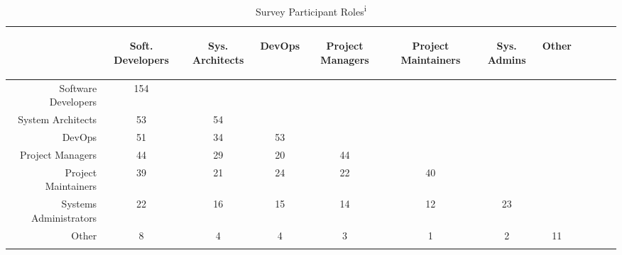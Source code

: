 \begin{table}[!htbp]
\renewcommand{\arraystretch}{1.3}
\caption{Survey Participant Roles\textsuperscript{i}}
\label{survey_roles}
\centering
\begin{tabularx}{0.45\textwidth}{@{}r|*{10}{C}c@{}}
\toprule
\addlinespace[5.4em]
	& \begin{rotate}{45} Soft. Developers \end{rotate} 
	& \begin{rotate}{45} Sys. Architects \end{rotate} 
	& \begin{rotate}{45} DevOps \end{rotate} 
	& \begin{rotate}{45} Project Managers \end{rotate}
	& \begin{rotate}{45} Project Maintainers \end{rotate}
	& \begin{rotate}{45} Sys. Admins \end{rotate}
	& \begin{rotate}{45} Other \end{rotate}\\
\midrule
	Software Developers & 154 & & & & & & \\
	System Architects & 53 & 54 & & & & & \\
	DevOps & 51 & 34 & 53 & & & & \\
	Project Managers & 44 & 29 & 20 & 44 & & & \\
	Project Maintainers & 39 & 21 & 24 & 22 & 40 & & \\
	Systems Administrators & 22 & 16 & 15 & 14 & 12 & 23 & \\
	Other & 8 & 4 & 4 & 3 & 1 & 2 & 11 \\
\bottomrule
\end{tabularx}
\vspace*{-\baselineskip}
\end{table}

